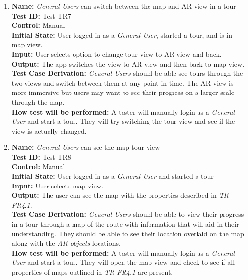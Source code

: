 \documentclass[12pt, titlepage]{article}
\begin{document}
\begin{enumerate}
    \item
    \textbf{Name:} \textit{General Users} can switch between the map and AR view in a tour \label{itm:Test-TR7} \\
    \textbf{Test ID:} Test-TR7 \\
    \textbf{Control:} Manual \\
    \textbf{Initial State:} User logged in as a \textit{General User}, started a tour, and is in map view. \\
    \textbf{Input:} User selects option to change tour view to AR view and back. \\
    \textbf{Output:} The app switches the view to AR view and then back to map view. \\
    \textbf{Test Case Derivation:} \textit{General Users} should be able see tours through the two views and switch between them at any point in time. The AR view is more immersive but users may want to see their progress on a larger scale through the map. \\
    \textbf{How test will be performed:} A tester will manually login as a \textit{General User} and start a tour. They will try switching the tour view and see if the view is actually changed.

    \item
    \textbf{Name:} \textit{General Users} can see the map tour view \label{itm:Test-TR8} \\
    \textbf{Test ID:} Test-TR8 \\
    \textbf{Control:} Manual \\
    \textbf{Initial State:} User logged in as a \textit{General User} and started a tour \\
    \textbf{Input:} User selects map view. \\
    \textbf{Output:} The user can see the map with the properties described in \textit{TR-FR4.1}. \\
    \textbf{Test Case Derivation:} \textit{General Users} should be able to view their progress in a tour through a map of the route with information that will aid in their understanding. They should be able to see their location overlaid on the map along with the \textit{AR objects} locations. \\
    \textbf{How test will be performed:} A tester will manually login as a \textit{General User} and start a tour. They will open the map view and check to see if all properties of maps outlined in \textit{TR-FR4.1} are present.


\end{enumerate}
\end{document}

